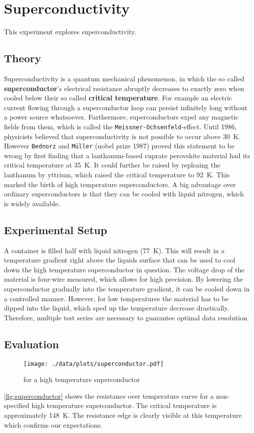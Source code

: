 \chapter{Superconductivity}
This experiment explores superconductivity.

\section{Theory}
Superconductivity is a quantum mechanical phenomenon, in which the so called \textbf{superconductor}'s electrical resistance abruptly decreases to exactly zero when cooled below their so called \textbf{critical temperature}.
For example an electric current flowing through a superconductor loop can persist infinitely long without a power source whatsoever.
Furthermore, superconductors expel any magnetic fields from them, which is called the \texttt{Meissner-Ochsenfeld}-effect.
Until 1986, physicists believed that superconductivity is not possible to occur above \SI{30}{\kelvin}.
However \texttt{Bednorz} and \texttt{Müller} (nobel prize 1987) proved this statement to be wrong by first finding that a lanthanum-based cuprate perovskite material had its critical temperature at \SI{35}{\kelvin}.
It could further be raised by replcaing the lanthanum by yttrium, which raised the critical temperature to \SI{92}{\kelvin}\cite{PhysRevLett.58.908}.
This marked the birth of high temperature superconductors.
A big advantage over ordinary superconductors is that they can be cooled with liquid nitrogen, which is widely available.

\section{Experimental Setup}
A container is filled half with liquid nitrogen (\SI{77}{\kelvin}).
This will result in a temperature gradient right above the liquids surface that can be used to cool down the high temperature superconductor in question.
The voltage drop of the material is four-wire measured, which allows for high precision.
By lowering the superconductor gradually into the temperature gradient, it can be cooled down in a controlled manner.
However, for low temperatures the material has to be dipped into the liquid, which sped up the temperature decrease drastically.
Therefore, multiple test series are necessary to guarantee optimal data resolution.

\section{Evaluation}
\begin{figure}[tbp]
	\centering
	\texttt{[image: ./data/plots/superconductor.pdf]}
	\caption[Superconductivity: Resistance over temperature]{ for a high temperature superconductor}
	\label{fig:superconductor}
\end{figure}
\autoref{fig:superconductor} shows the resistance over temperature curve for a non-specified high temperature superconductor.
The critical temperature is approximately \SI{148}{\kelvin}.
The resistance edge is clearly visible at this temperature which confirms our expectations.
